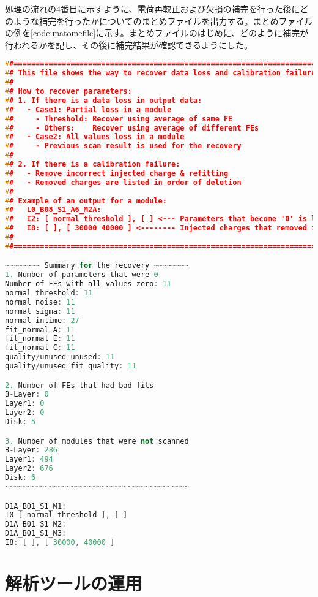処理の流れの4番目に示すように、電荷再較正および欠損の補完を行った後にどのような補完を行ったかについてのまとめファイルを出力する。まとめファイルの例を\cref{code:matomefile}に示す。まとめファイルのはじめに、どのように補完が行われるかを記し、その後に補完結果が確認できるようにした。

\begin{lstlisting}[caption=解析ツールにより出力される補完結果のまとめ。,label=code:matomefile, language=C++]
##===========================================================================
## This file shows the way to recover data loss and calibration failure.
##
## How to recover parameters:
## 1. If there is a data loss in output data:
##   - Case1: Partial loss in a module
##     - Threshold: Recover using average of same FE
##     - Others:    Recover using average of different FEs
##   - Case2: All values loss in a module
##     - Previous scan result is used for the recovery
##
## 2. If there is a calibration failure:
##   - Remove incorrect injected charge & refitting
##   - Removed charges are listed in order of deletion
##
## Example of an output for a module:
##   L0_B08_S1_A6_M2A:
##   I2: [ normal threshold ], [ ] <--- Parameters that become '0' is listed
##   I8: [ ], [ 30000 40000 ] <-------- Injected charges that removed is listed
##
##===========================================================================

~~~~~~~~ Summary for the recovery ~~~~~~~~
1. Number of parameters that were 0
Number of FEs with all values zero: 11
normal threshold: 11
normal noise: 11
normal sigma: 11
normal intime: 27
fit_normal A: 11
fit_normal E: 11
fit_normal C: 11
quality/unused unused: 11
quality/unused fit_quality: 11

2. Number of FEs that had bad fits
B-Layer: 0
Layer1: 0
Layer2: 0
Disk: 5

3. Number of modules that were not scanned
B-Layer: 286
Layer1: 494
Layer2: 676
Disk: 6
~~~~~~~~~~~~~~~~~~~~~~~~~~~~~~~~~~~~~~~~~~

D1A_B01_S1_M1:
I0 [ normal threshold ], [ ]
D1A_B01_S1_M2:
D1A_B01_S1_M3:
I8: [ ], [ 30000, 40000 ]
\end{lstlisting}



\section{解析ツールの運用}
\label{sec:unnyou}


